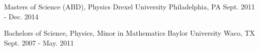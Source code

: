 

\begin{cventries}

  \cventry
    {Masters of Science (ABD), Physics} %
    {Drexel University} %
    {Philadelphia, PA} %
    {Sept. 2011 - Dec. 2014} %
    {}

  \cventry
    {Bachelors of Science, Physics, Minor in Mathematics} %
    {Baylor University} %
    {Waco, TX} %
    {Sept. 2007 - May. 2011} %
    {}
\end{cventries}
